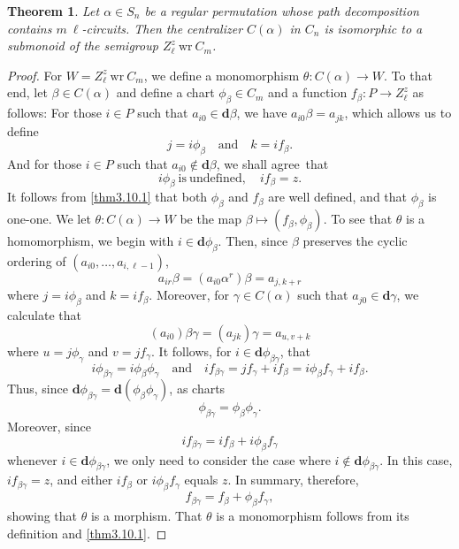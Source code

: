 \documentclass{surv-l}
\numberwithin{equation}{section}
\numberwithin{table}{section}
\numberwithin{figure}{section}
\newtheorem{theorem}[equation]{Theorem}
\theoremstyle{definition}
\begin{document}
\begin{theorem}\label{thm4.14.1}
Let $\alpha\in S_{n}$ be a regular permutation whose path
decomposition contains $m\ \ell$-circuits. Then the centralizer
$C(\alpha)$ in $C_{n}$ is isomorphic to a submonoid of the
semigroup $Z_{\ell}^{z}\ \mathrm{wr}\ C_{m}$.
\end{theorem}

\begin{proof} For $W=Z_{\ell}^{z}\  \mathrm{wr} \ C_{m}$, we define a monomorphism
$\theta : C(\alpha)\rightarrow W$. To that end, let $\beta\in
C(\alpha)$ and define a chart $\phi_{\beta}\in C_{m}$ and a
function $f_{\beta} : P\rightarrow Z_{\ell}^{z}$ as follows: For
those $i\in P$ such that $ a_{i0}\in \mathbf{d}\beta$, we have
$a_{i0}\beta=a_{jk}$, which allows us to define
\[
j=i\phi_{\beta}\quad \mathrm{and}\quad k=if_{\beta}.
\]
And for those $i\in P$ such that $a_{i0}\not\in \mathbf{d}\beta$,
we shall agree~that
\[
i\phi_{\beta}\ \mathrm{is\ undefined,}\quad if_{\beta}=z.
\]
It follows from \ref{thm3.10.1} that both $\phi_{\beta}$ and
$f_{\beta}$ are well defined, and that $\phi_{\beta}$ is one-one.
We let $\theta : C(\alpha)\rightarrow W$ be the map
$\beta\mapsto(f_{\beta},\phi_{\beta})$. To see that $\theta$ is
a homomorphism, we begin with $i\in \mathbf{d}\phi_{\beta}$. Then,
since $\beta$ preserves the cyclic ordering of $(a_{i0},\ldots,
a_{i,\ell-1})$,
\[
a_{ir}\beta=(a_{i0}\alpha^{r})\beta=a_{j,k+r}
\]
where $j=i\phi_{\beta}$ and $k=if_{\beta}$. Moreover, for
$\gamma\in C(\alpha)$ such that $a_{j0}\in \mathbf{d}\gamma$, we
calculate that
\[
(a_{i0})\beta\gamma=(a_{jk})\gamma=a_{u,v+k}
\]
where $u=j\phi_{\gamma}$ and $v=jf_{\gamma}$. It follows, for
$i\in \mathbf{d}\phi_{\beta\gamma}$, that
\[
i\phi_{\beta\gamma}=i\phi_{\beta}\phi_{\gamma}\quad \mathrm{and}\quad
if_{\beta\gamma}=jf_{\gamma}+if_{\beta}=i\phi_{\beta}f_{\gamma}+if_{\beta}.
\]
Thus, since
$\mathbf{d}\phi_{\beta\gamma}=\mathbf{d}(\phi_{\beta}\phi_{\gamma})$,
as charts
\[
\phi_{\beta\gamma}=\phi_{\beta}\phi_{\gamma}.
\]
Moreover, since
\[
if_{\beta\gamma}=if_{\beta}+i\phi_{\beta}f_{\gamma}
\]
whenever $i\in \mathbf{d}\phi_{\beta\gamma}$, we only need to
consider the case where $i\not\in \mathbf{d}\phi_{\beta\gamma}$.
In this case, $if_{\beta\gamma}=z$, and either $if_{\beta}$ or
$i\phi_{\beta}f_{\gamma}$ equals $z$. In summary, therefore,
\[
f_{\beta\gamma}=f_{\beta}+\phi_{\beta}f_{\gamma},
\]
showing that $\theta$ is a morphism. That $\theta$ is a
monomorphism follows from its definition and \ref{thm3.10.1}.
\end{proof}
\end{document}
